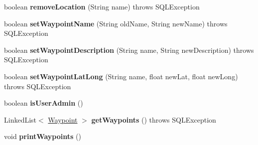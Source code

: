 \begin{DoxyCompactItemize}
\item 
\hypertarget{classcom_1_1twix_1_1tailoredtravels_1_1_database_manager_ac60ff9d81a074ef84eb0f6ced1fa7fde}{boolean {\bfseries remove\-Location} (String name)  throws S\-Q\-L\-Exception }\label{classcom_1_1twix_1_1tailoredtravels_1_1_database_manager_ac60ff9d81a074ef84eb0f6ced1fa7fde}

\item 
\hypertarget{classcom_1_1twix_1_1tailoredtravels_1_1_database_manager_a4c8078e19441474ebb02fd67dfe9d3b4}{boolean {\bfseries set\-Waypoint\-Name} (String old\-Name, String new\-Name)  throws S\-Q\-L\-Exception }\label{classcom_1_1twix_1_1tailoredtravels_1_1_database_manager_a4c8078e19441474ebb02fd67dfe9d3b4}

\item 
\hypertarget{classcom_1_1twix_1_1tailoredtravels_1_1_database_manager_a2edac01eb48ca205568421c1aeaef677}{boolean {\bfseries set\-Waypoint\-Description} (String name, String new\-Description)  throws S\-Q\-L\-Exception }\label{classcom_1_1twix_1_1tailoredtravels_1_1_database_manager_a2edac01eb48ca205568421c1aeaef677}

\item 
\hypertarget{classcom_1_1twix_1_1tailoredtravels_1_1_database_manager_a0b8a3295e6857761b89a8db4d048d5a4}{boolean {\bfseries set\-Waypoint\-Lat\-Long} (String name, float new\-Lat, float new\-Long)  throws S\-Q\-L\-Exception }\label{classcom_1_1twix_1_1tailoredtravels_1_1_database_manager_a0b8a3295e6857761b89a8db4d048d5a4}

\item 
\hypertarget{classcom_1_1twix_1_1tailoredtravels_1_1_database_manager_a2ccf63adbc938676d9bafbf43667261a}{boolean {\bfseries is\-User\-Admin} ()}\label{classcom_1_1twix_1_1tailoredtravels_1_1_database_manager_a2ccf63adbc938676d9bafbf43667261a}

\item 
\hypertarget{classcom_1_1twix_1_1tailoredtravels_1_1_database_manager_a4e594f8a6f845de1fe5ab29e5430ba9e}{Linked\-List$<$ \hyperlink{classcom_1_1twix_1_1tailoredtravels_1_1_waypoint}{Waypoint} $>$ {\bfseries get\-Waypoints} ()  throws S\-Q\-L\-Exception }\label{classcom_1_1twix_1_1tailoredtravels_1_1_database_manager_a4e594f8a6f845de1fe5ab29e5430ba9e}

\item 
\hypertarget{classcom_1_1twix_1_1tailoredtravels_1_1_database_manager_ac69a6164612bb086c72c54440d32f3de}{void {\bfseries print\-Waypoints} ()}\label{classcom_1_1twix_1_1tailoredtravels_1_1_database_manager_ac69a6164612bb086c72c54440d32f3de}

\end{DoxyCompactItemize}
